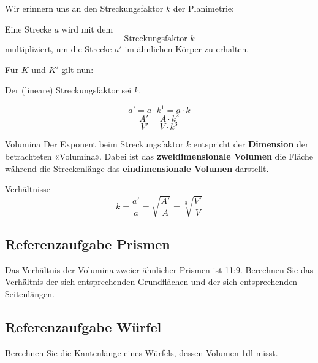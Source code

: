Wir erinnern uns an den Streckungsfaktor $k$ der Planimetrie:
\begin{definition}{}{}
  Eine Strecke $a$ wird mit dem
  $$\textrm{Streckungsfaktor} \,\, k$$
  multipliziert, um die Strecke $a'$ im ähnlichen Körper zu erhalten.
\end{definition}

Für $K$ und $K'$ gilt nun:

\begin{gesetz}{}{}
  Der (lineare) Streckungsfaktor sei $k$.

  $$a' = a \cdot{} k^1 = a\cdot{}k $$
  $$A' = A \cdot{} k^2 $$
  $$V' = V \cdot{} k^3 $$
\end{gesetz}

\begin{bemerkung}{Volumina}{}
Der Exponent beim Streckungsfaktor $k$ entspricht der \textbf{Dimension} der
betrachteten «Volumina». Dabei ist das \textbf{zweidimensionale Volumen} die
Fläche während die Streckenlänge das \textbf{eindimensionale Volumen} darstellt.
\end{bemerkung}

\begin{bemerkung}{Verhältnisse}{}
  $$k = \frac{a'}{a} = \sqrt{\frac{A'}{A}} = \sqrt[3\,\,\,]{\frac{V'}{V}}$$
\end{bemerkung}
\newpage


\subsection{Referenzaufgabe Prismen}
Das Verhältnis der Volumina zweier ähnlicher Prismen ist
11:9. Berechnen Sie das Verhältnis der sich entsprechenden Grundflächen und
der sich entsprechenden Seitenlängen.


\subsection{Referenzaufgabe Würfel}
Berechnen Sie die Kantenlänge eines Würfels, dessen Volumen 1dl misst.


\newpage
